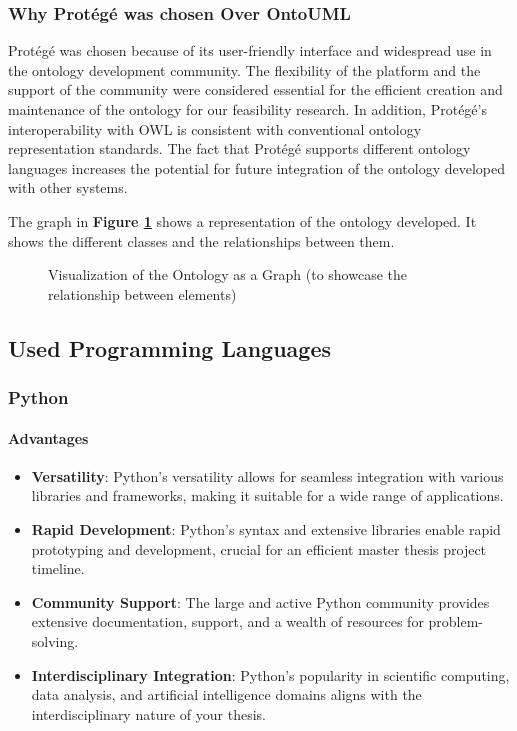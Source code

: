     \subsubsection{Why Protégé was chosen Over OntoUML}
    Protégé was chosen because of its user-friendly interface and widespread use in the ontology development community. The flexibility of the platform and the support of the community were considered essential for the efficient creation and maintenance of the ontology for our feasibility research. In addition, Protégé's interoperability with OWL is consistent with conventional ontology representation standards. The fact that Protégé supports different ontology languages increases the potential for future integration of the ontology developed with other systems.
    
    The graph in \textbf{Figure \ref{fig:viz-ontology}} shows a representation of the ontology developed. It shows the different classes and the relationships between them.
    
    \begin{figure}[p]
        
         \caption{\label{fig:viz-ontology}  Visualization of the Ontology as a Graph (to showcase the relationship between elements)}
    \end{figure}

    
\subsection{Used Programming Languages}
    \subsubsection{Python}
        \paragraph{Advantages}
        \begin{itemize}
            \item \textbf{Versatility}: Python's versatility allows for seamless integration with various libraries and frameworks, making it suitable for a wide range of applications.
            \item \textbf{Rapid Development}: Python's syntax and extensive libraries enable rapid prototyping and development, crucial for an efficient master thesis project timeline.
            \item \textbf{Community Support}: The large and active Python community provides extensive documentation, support, and a wealth of resources for problem-solving.
            \item \textbf{Interdisciplinary Integration}: Python's popularity in scientific computing, data analysis, and artificial intelligence domains aligns with the interdisciplinary nature of your thesis.
        \end{itemize}
        
